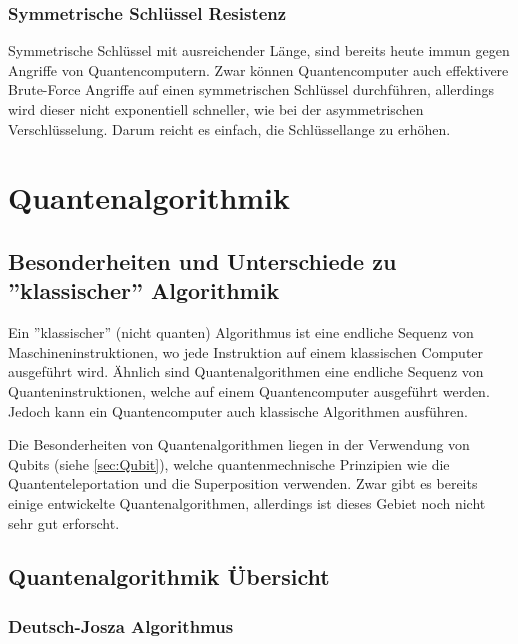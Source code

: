 \subsubsection{Symmetrische Schlüssel Resistenz}
\label{Symmetrische Schlüssel Resistenz}

Symmetrische Schlüssel mit ausreichender Länge, sind bereits heute immun gegen Angriffe von Quantencomputern. \cite{symkeyresistance} 
Zwar können Quantencomputer auch effektivere Brute-Force Angriffe auf einen symmetrischen Schlüssel durchführen, allerdings wird dieser nicht exponentiell schneller, wie bei der asymmetrischen Verschlüsselung.
Darum reicht es einfach, die Schlüssellange zu erhöhen.

\newpage


\section{Quantenalgorithmik}
\label{sec:Quantenalgorithmik}


\subsection{Besonderheiten und Unterschiede zu ''klassischer'' Algorithmik}
\label{sec:Besonderheiten und Unterschiede zu klassischer Algorithmik}

Ein ''klassischer'' (nicht quanten) Algorithmus ist eine endliche Sequenz von Maschineninstruktionen, wo jede Instruktion auf einem klassischen Computer ausgeführt wird.
Ähnlich sind Quantenalgorithmen eine endliche Sequenz von Quanteninstruktionen, welche auf einem Quantencomputer ausgeführt werden. Jedoch kann ein Quantencomputer auch klassische Algorithmen ausführen. \cite{quantenalgorithmgwiki}

Die Besonderheiten von Quantenalgorithmen liegen in der Verwendung von Qubits (siehe \ref{sec:Qubit}), welche quantenmechnische Prinzipien wie die Quantenteleportation und die Superposition verwenden.
Zwar gibt es bereits einige entwickelte Quantenalgorithmen, allerdings ist dieses Gebiet noch nicht sehr gut erforscht.


\subsection{Quantenalgorithmik Übersicht}
\label{sec:Quantenalgorithmik Übersicht}


\subsubsection{Deutsch-Josza Algorithmus}

